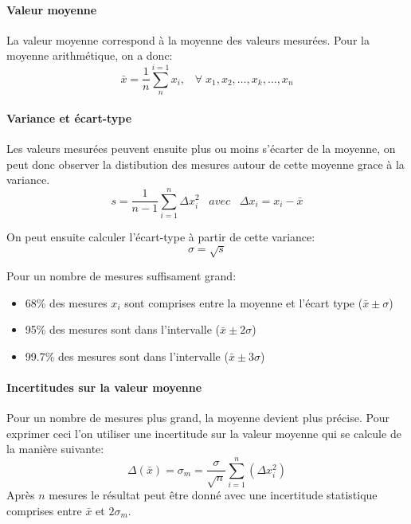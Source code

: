 \paragraph{Valeur moyenne}
La valeur moyenne correspond à la moyenne des valeurs mesurées. Pour la moyenne arithmétique, on a donc:
\begin{equation}
    \bar{x}=\frac{1}{n}\sum_{n}^{i=1}x_i,\;\;\; \forall \; x_1, x_2, \ldots, x_k, \ldots, x_n
\end{equation}

\paragraph{Variance et écart-type}
Les valeurs mesurées peuvent ensuite plus ou moins s'écarter de la moyenne, on peut donc observer la distibution des mesures autour de cette moyenne grace à la variance.
\begin{equation}
    s=\frac{1}{n-1}\sum_{i=1}^{n}\Delta x_i^2 \;\;\; avec \;\;\; \Delta x_i = x_i-\bar{x}
\end{equation}

On peut ensuite calculer l'écart-type à partir de cette variance:
\begin{equation}
    \sigma=\sqrt{s}
\end{equation}

Pour un nombre de mesures suffisament grand:
\begin{itemize}
    \item 68\% des mesures $x_i$ sont comprises entre la moyenne et l'écart type ($\bar{x}\pm\sigma$)
    \item 95\% des mesures sont dans l'intervalle ($\bar{x}\pm2\sigma$)
    \item 99.7\% des mesures sont dans l'intervalle ($\bar{x}\pm3\sigma$)
\end{itemize}

\paragraph{Incertitudes sur la valeur moyenne}
Pour un nombre de mesures plus grand, la moyenne devient plus précise. Pour exprimer ceci l'on utiliser une incertitude sur la valeur moyenne qui se calcule de la manière suivante:
\begin{equation}
    \Delta(\bar{x})=\sigma_m=\frac{\sigma}{\sqrt{n}}\sum_{i=1}^{n}(\Delta x_i^2)
\end{equation}
Après $n$ mesures le résultat peut être donné avec une incertitude statistique comprises entre $\bar{x}$ et $2\sigma_m$.
